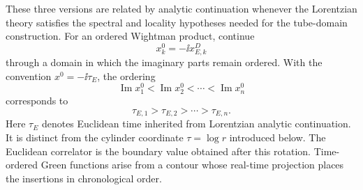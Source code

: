 These three versions are related by analytic continuation whenever the
Lorentzian theory satisfies the spectral and locality hypotheses needed for
the tube-domain construction.  For an ordered Wightman product, continue
\[
  x^0_k=-\ii x^D_{E,k}
\]
through a domain in which the imaginary parts remain ordered.  With the
convention \(x^0=-\ii\tau_E\), the ordering
\[
  \operatorname{Im}x^0_1<\operatorname{Im}x^0_2<\cdots<
  \operatorname{Im}x^0_n
\]
corresponds to
\[
  \tau_{E,1}>\tau_{E,2}>\cdots>\tau_{E,n}.
\]
Here \(\tau_E\) denotes Euclidean time inherited from Lorentzian analytic
continuation.  It is distinct from the cylinder coordinate \(\tau=\log r\)
introduced below.  The Euclidean correlator is the boundary value obtained
after this rotation.
Time-ordered Green functions arise from a contour whose real-time projection
places the insertions in chronological order.

